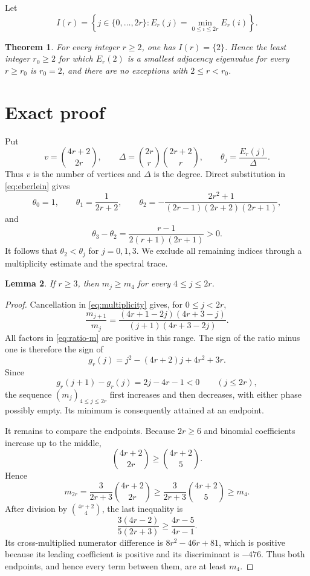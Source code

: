 \documentclass[11pt]{article}
\newtheorem{theorem}{Theorem}
\newtheorem{lemma}[theorem]{Lemma}
\begin{document}
Let
\[
 I(r)=\left\{j\in\{0,\ldots,2r\}:E_r(j)
 =\min_{0\leq i\leq2r}E_r(i)\right\}.
\]

\begin{theorem}\label{thm:main}
For every integer $r\geq2$, one has $I(r)=\{2\}$.  Hence the least integer
$r_0\geq2$ for which $E_r(2)$ is a smallest adjacency eigenvalue for every
$r\geq r_0$ is $r_0=2$, and there are no exceptions with
$2\leq r<r_0$.
\end{theorem}

\section{Exact proof}

Put
\[
 v=\binom{4r+2}{2r},\qquad
 \Delta=\binom{2r}{r}\binom{2r+2}{r},\qquad
 \theta_j=\frac{E_r(j)}{\Delta}.
\]
Thus $v$ is the number of vertices and $\Delta$ is the degree.
Direct substitution in \eqref{eq:eberlein} gives
\begin{equation}\label{eq:low-indices}
 \theta_0=1,\qquad
 \theta_1=\frac{1}{2r+2},\qquad
 \theta_2=-\frac{2r^2+1}{(2r-1)(2r+2)(2r+1)},
\end{equation}
and
\begin{equation}\label{eq:theta3}
 \theta_3-\theta_2=\frac{r-1}{2(r+1)(2r+1)}>0.
\end{equation}
It follows that $\theta_2<\theta_j$ for $j=0,1,3$.  We exclude all
remaining indices through a multiplicity estimate and the spectral trace.

\begin{lemma}\label{lem:multiplicity}
If $r\geq3$, then $m_j\geq m_4$ for every $4\leq j\leq2r$.
\end{lemma}

\begin{proof}
Cancellation in \eqref{eq:multiplicity} gives, for $0\leq j<2r$,
\begin{equation}\label{eq:ratio-m}
 \frac{m_{j+1}}{m_j}=
 \frac{(4r+1-2j)(4r+3-j)}{(j+1)(4r+3-2j)}.
\end{equation}
All factors in \eqref{eq:ratio-m} are positive in this range.  The sign of
the ratio minus one is therefore the sign of
\[
 g_r(j)=j^2-(4r+2)j+4r^2+3r.
\]
Since
\[
 g_r(j+1)-g_r(j)=2j-4r-1<0\qquad (j\leq2r),
\]
the sequence $(m_j)_{4\leq j\leq2r}$ first increases and then decreases,
with either phase possibly empty.  Its minimum is consequently attained at
an endpoint.

It remains to compare the endpoints.  Because $2r\geq6$ and binomial
coefficients increase up to the middle,
\[
 \binom{4r+2}{2r}\geq\binom{4r+2}{5}.
\]
Hence
\[
 m_{2r}=\frac{3}{2r+3}\binom{4r+2}{2r}
 \geq \frac{3}{2r+3}\binom{4r+2}{5}\geq m_4.
\]
After division by $\binom{4r+2}{4}$, the last inequality is
\[
 \frac{3(4r-2)}{5(2r+3)}\geq\frac{4r-5}{4r-1}.
\]
Its cross-multiplied numerator difference is
$8r^2-46r+81$, which is positive because its leading coefficient is
positive and its discriminant is $-476$.  Thus both endpoints, and hence
every term between them, are at least $m_4$.
\end{proof}
\end{document}
